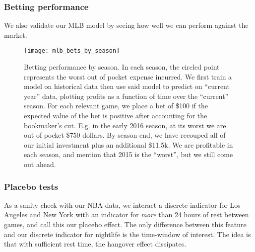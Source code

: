 \documentclass[letterpaper,12pt]{article}
\begin{document}
\subsubsection{Betting performance}
We also validate our MLB model by seeing how well we can perform against the
market.
\begin{figure}[!h]
  \centering
  \label{mlb bets by season}
  \texttt{[image: mlb\_bets\_by\_season]}
  \caption{Betting performance by season. In each season, the 
    circled point represents the worst out of pocket expense incurred.
    We first train a model on historical data then use said model to predict on ``current year''
    data, plotting profits as a function of time over the ``current'' season. For each relevant
    game, we place a bet of \$100 if the expected value of the bet is positive after accounting for the bookmaker's cut. E.g. in the     early 2016 season,
    at its worst we are out of pocket \$750 dollars. By season end, we have     recouped all of
    our initial investment plus an additional \$11.5k. We are profitable in each season, and mention that 2015 is the ``worst'', but we still come out ahead.}
  \label{bettingperf}
\end{figure}

\subsubsection{Placebo tests} As a sanity check with our NBA data, we interact a
discrete-indicator for Los Angeles and New York with an 
indicator for \emph{more} than 24 hours of rest
between games, and call this our placebo effect. The only difference between this feature
and our discrete indicator for nightlife is the time-window of interest.
The idea is that with sufficient rest time, the hangover effect dissipates.
\end{document}
